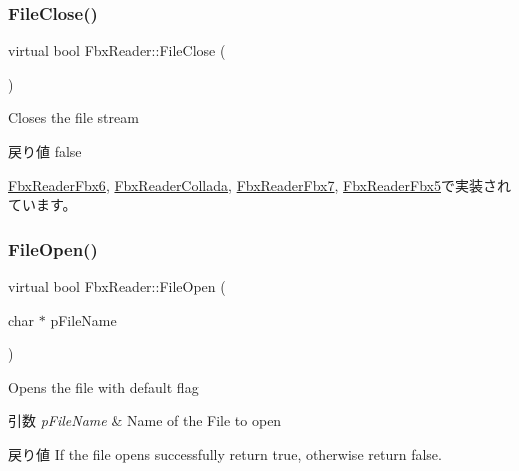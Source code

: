 \mbox{\label{class_fbx_reader_a327df94e5c24315fc5cbcedf0e7bb615}} 
\subsubsection{\texorpdfstring{File\+Close()}{FileClose()}}
{\footnotesize\ttfamily virtual bool Fbx\+Reader\+::\+File\+Close (\begin{DoxyParamCaption}{ }\end{DoxyParamCaption})\hspace{0.3cm}{\ttfamily [pure virtual]}}

Closes the file stream \begin{DoxyReturn}{戻り値}
{\ttfamily false} 
\end{DoxyReturn}


\hyperlink{class_fbx_reader_fbx6_a05230d40a8c8c2f62afee63f70a8d3be}{Fbx\+Reader\+Fbx6}, \hyperlink{class_fbx_reader_collada_a5668036ed12534fd339f3106c0d09864}{Fbx\+Reader\+Collada}, \hyperlink{class_fbx_reader_fbx7_a06f5323e8d483a1103d54fc53cceadc9}{Fbx\+Reader\+Fbx7}, \hyperlink{class_fbx_reader_fbx5_a315730ff4083066964d32c6d3b3a717d}{Fbx\+Reader\+Fbx5}で実装されています。

\mbox{\label{class_fbx_reader_a6105bd37ae86c03f35aee6f62901856d}} 
\subsubsection{\texorpdfstring{File\+Open()}{FileOpen()}\hspace{0.1cm}{\footnotesize\ttfamily [1/4]}}
{\footnotesize\ttfamily virtual bool Fbx\+Reader\+::\+File\+Open (\begin{DoxyParamCaption}\item[{char $\ast$}]{p\+File\+Name }\end{DoxyParamCaption})\hspace{0.3cm}{\ttfamily [pure virtual]}}

Opens the file with default flag 
\begin{DoxyParams}{引数}
{\em p\+File\+Name} & Name of the File to open \\
\hline
\end{DoxyParams}
\begin{DoxyReturn}{戻り値}
If the file opens successfully return {\ttfamily true}, otherwise return {\ttfamily false}. 
\end{DoxyReturn}


